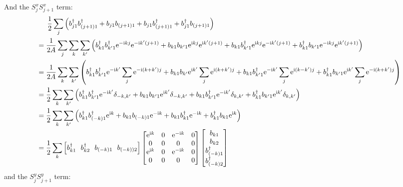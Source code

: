 \documentclass[letterpaper,10pt]{article}
\newcommand{\e}{\mathrm{e}}
\newcommand{\ii}{\mathrm{i}}
\begin{document}
And the $S_j^x S_{j+1}^x$ term:
$$\begin{aligned}
    & \indent  \frac{1}{2}\sum_{j}\left(b_{j1}^{\dagger}b_{(j+1)1}^{\dagger}+b_{j1}b_{(j+1)1}+b_{j1}b_{(j+1)1}^{\dagger}+b_{j1}^{\dagger}b_{(j+1)1}\right)\\
    &=\frac{1}{2A}\sum_{j}\sum_{k}\sum_{k'}\left(b_{k1}^{\dagger}b_{k'1}^{\dagger}\e^{-\ii kj}\e^{-\ii k'(j+1)}+b_{k1}b_{k'1}\e^{\ii kj}\e^{\ii k'(j+1)}+b_{k1}b_{k'1}^{\dagger}\e^{\ii kj}\e^{-\ii k'(j+1)}+b_{k1}^{\dagger}b_{k'1}\e^{-\ii kj}\e^{\ii k'(j+1)}\right)\\
    &=\frac{1}{2A}\sum_{k}\sum_{k'}\left(b_{k1}^{\dagger}b_{k'1}^{\dagger}\e^{-\ii k'}\sum_j \e^{-\ii (k+k')j}+b_{k1}b_{k'}\e^{\ii k'}\sum_j \e^{\ii (k+k')j}+b_{k1}b_{k'1}^{\dagger}\e^{-\ii k'}\sum_j \e^{\ii (k-k')j}+b_{k1}^{\dagger}b_{k'1}\e^{\ii k'}\sum_j \e^{-\ii (k+k')j}\right)\\
    &=\frac{1}{2}\sum_k\sum_{k'}\left(b_{k1}^{\dagger}b_{k'1}^{\dagger}\e^{-\ii k'}\delta_{-k,k'}+b_{k1}b_{k'1}\e^{\ii k'}\delta_{-k,k'}+b_{k1}b_{k'1}^{\dagger}\e^{-\ii k'}\delta_{k,k'}+b_{k1}^{\dagger}b_{k'1}\e^{\ii k'}\delta_{k,k'}\right)\\
    &=\frac{1}{2}\sum_k\sum_{k'}\left(b_{k1}^{\dagger}b_{(-k)1}^{\dagger}\e^{\ii k}+b_{k1}b_{(-k)1}\e^{-\ii k}+b_{k1}b_{k1}^{\dagger}\e^{-\ii k}+b_{k1}^{\dagger}b_{k1}\e^{\ii k}\right)\\
    &=\frac{1}{2}\sum_k \left[
      b_{k1}^{\dagger} \ \ 
      b_{k2}^{\dagger}\  \ 
      b_{(-k)1}\ \ 
      b_{(-k))2}\right]
     \begin{bmatrix}
          \e^{\ii k} & 0 & \e^{-\ii k} & 0 \\
         0 &  0 & 0 &0 \\
         \e^{\ii k} &  0 & \e^{-\ii k} &0\\
          0 & 0 & 0& 0
          \end{bmatrix}\begin{bmatrix}
              b_{k1}  \\
              b_{k2}  \\
              b_{(-k)1}^{\dagger}\\
              b_{(-k)2}^{\dagger}
              \end{bmatrix}
  \end{aligned}
  $$
  and the $S_j^y S_{j+1}^y$ term:
\end{document}
